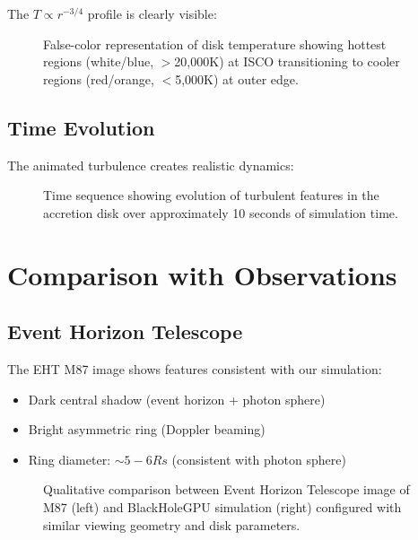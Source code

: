 \documentclass[12pt,a4paper]{article}
\theoremstyle{definition}
\theoremstyle{remark}
\begin{document}
The $T \propto r^{-3/4}$ profile is clearly visible:

\begin{figure}[H]
    \centering
    \caption{False-color representation of disk temperature showing hottest regions (white/blue, $>$20,000K) at ISCO transitioning to cooler regions (red/orange, $<$5,000K) at outer edge.}
    \label{fig:temperature_map}
\end{figure}

\subsection{Time Evolution}

The animated turbulence creates realistic dynamics:

\begin{figure}[H]
    \centering
    \caption{Time sequence showing evolution of turbulent features in the accretion disk over approximately 10 seconds of simulation time.}
    \label{fig:time_evolution}
\end{figure}

\section{Comparison with Observations}

\subsection{Event Horizon Telescope}

The EHT M87 image shows features consistent with our simulation:

\begin{itemize}
    \item Dark central shadow (event horizon + photon sphere)
    \item Bright asymmetric ring (Doppler beaming)
    \item Ring diameter: $\sim 5-6 Rs$ (consistent with photon sphere)
\end{itemize}

\begin{figure}[H]
    \centering
    \caption{Qualitative comparison between Event Horizon Telescope image of M87 (left) and BlackHoleGPU simulation (right) configured with similar viewing geometry and disk parameters.}
    \label{fig:eht_comparison}
\end{figure}
\end{document}

